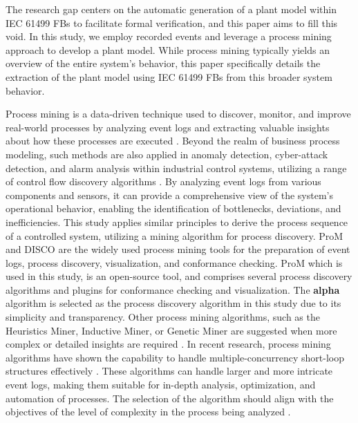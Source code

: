 \documentclass{ieeeojies}
\begin{document}
The research gap centers on the automatic generation of a plant model within IEC 61499 FBs to facilitate formal verification, and this paper aims to fill this void. In this study, we employ recorded events and leverage a process mining approach to develop a plant model. While process mining typically yields an overview of the entire system's behavior, this paper specifically details the extraction of the plant model using IEC 61499 FBs from this broader system behavior.



Process mining is a data-driven technique used to discover, monitor, and improve real-world processes by analyzing event logs and extracting valuable insights about how these processes are executed \cite{agrawal1998mining, van2012process1}. Beyond the realm of business process modeling, such methods are also applied in anomaly detection, cyber-attack detection, and alarm analysis within industrial control systems, utilizing a range of control flow discovery algorithms \cite{xavier2022process}. By analyzing event logs from various components and sensors, it can provide a comprehensive view of the system's operational behavior, enabling the identification of bottlenecks, deviations, and inefficiencies. This study applies similar principles to derive the process sequence of a controlled system, utilizing a mining algorithm for process discovery. ProM \cite{van2005prom} and DISCO \cite{gunther2012disco} are the widely used process mining tools for the preparation of event logs, process discovery, visualization, and conformance checking.  ProM \cite{ProM} which is used in this study, is an open-source tool, and comprises several process discovery algorithms and plugins for conformance checking and visualization. The \textbf{alpha} algorithm \cite{petri1962} is selected as the process discovery algorithm in this study due to its simplicity and transparency. Other process mining algorithms, such as the Heuristics Miner, Inductive Miner, or Genetic Miner are suggested when more complex or detailed insights are required \cite{dunzer2019conformance, naderifar2019review}. In recent research, process mining algorithms have shown the capability to handle multiple-concurrency short-loop structures effectively \cite{sun2021algorithm,sun2021process}. These algorithms can handle larger and more intricate event logs, making them suitable for in-depth analysis, optimization, and automation of processes. The selection of the algorithm should align with the objectives of the level of complexity in the process being analyzed \cite{xavier2022process}.
\end{document}
